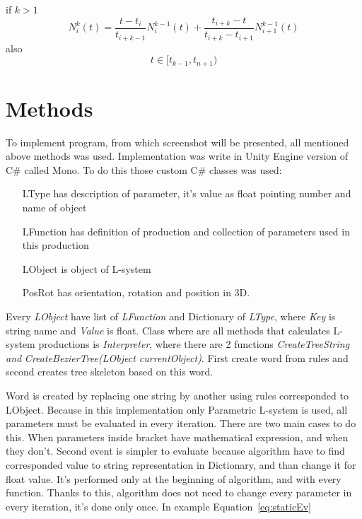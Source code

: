\documentclass[b5paper,twoside,11pt]{article}
\begin{document}
  if $k > 1$
   \begin{equation}
  N_{i}^{k}(t)=\frac{t-t_i}{t_{i+k-1}} N_{i}^{k-1}(t) + \frac{t_{i+k} - t}{t_{i+k} - t_{i+1}} N_{i+1}^{k-1}(t)
 \end{equation}
 also
    \begin{equation}
    t\in[t_{k-1},t_{n+1})	
 \end{equation}

\section{Methods}
To implement program, from which screenshot will be presented, all mentioned above methods was used. Implementation was write in Unity Engine version of C\# called Mono. To do this those custom C\# classes was used:
\begin{itemize}[labelindent=5.5em,labelsep=1cm,leftmargin=*]
\item [LType] has description of parameter, it's value as float pointing number and name of object
\item [LFunction] has definition of production and collection of parameters used in this production
\item [LObject] is object of L-system
\item [PosRot] has orientation, rotation and position in 3D.
\end{itemize}
Every \textit{LObject} have list of \textit{LFunction} and Dictionary of \textit{LType}, where \textit{Key} is string name and \textit{Value} is float.
Class where are all methods that calculates L-system productions is \textit{Interpreter}, where there are 2  functions \textit{CreateTreeString and} \textit{CreateBezierTree(LObject currentObject)}. First create word from rules and second creates tree skeleton based on this word. \par
Word is created by replacing one string by another using rules corresponded to LObject. Because in this implementation only Parametric L-system is used, all parameters must be evaluated in every iteration. There are two main cases to do this. When parameters inside bracket have mathematical expression, and when they don't. Second event is simpler to evaluate because algorithm have to find corresponded value to string representation in Dictionary, and than change it for float value. It's performed only at the beginning of algorithm, and with every function. Thanks to this, algorithm does not need to change every parameter in every iteration, it's done only once.
In example Equation~\ref{eq:staticEv}
\end{document}
